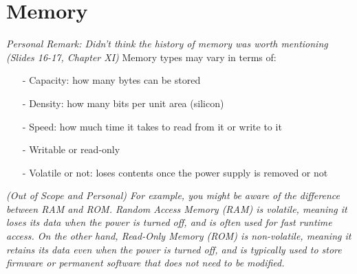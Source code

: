 \documentclass[12pt,openany]{book}
\begin{document}
\section{Memory}
\textit{Personal Remark: Didn't think the history of memory was worth mentioning (Slides 16-17, Chapter XI)}
Memory types may vary in terms of:
\begin{justify}
	\begin{itemize}
		\setlength\itemsep{-2px}
		\item[-] Capacity: how many bytes can be stored
		\item[-] Density: how many bits per unit area (silicon)
		\item[-] Speed: how much time it takes to read from it or write to it
		\item[-] Writable or read-only
		\item[-] Volatile or not: loses contents once the power supply is removed or not
	\end{itemize}
\end{justify}
\textit{(Out of Scope and Personal) For example, you might be aware of the difference between RAM and ROM. Random Access Memory (RAM) is volatile, meaning it loses its data when the power is turned off, and is often used for fast runtime access. On the other hand, Read-Only Memory (ROM) is non-volatile, meaning it retains its data even when the power is turned off, and is typically used to store firmware or permanent software that does not need to be modified.}
\end{document}

